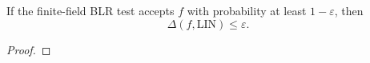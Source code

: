\begin{theorem}
\label{cor:ff-high-acceptance-close-to-linear}
\leanok
If the finite-field BLR test accepts $f$ with probability at least
  $1 - \varepsilon$, then
  \[
    \Delta(f,\mathrm{LIN}) \le \varepsilon.
  \]
\end{theorem}
\begin{proof}
\leanok
\end{proof}
